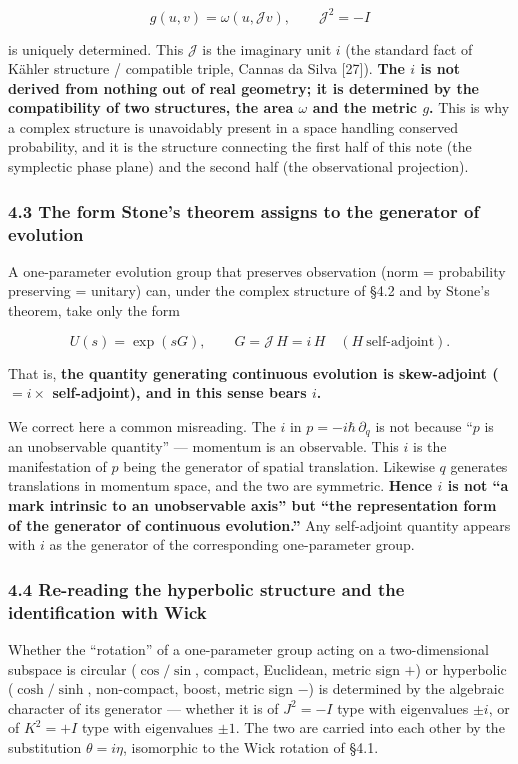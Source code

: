 \documentclass[
]{article}
\begin{document}
\[g(u,v)=\omega(u,\mathcal{J}v),\qquad \mathcal{J}^2=-I\]

is uniquely determined. This \(\mathcal{J}\) is the imaginary unit \(i\)
(the standard fact of Kähler structure / compatible triple, Cannas da
Silva {[}27{]}). \textbf{The \(i\) is not derived from nothing out of
real geometry; it is determined by the compatibility of two structures,
the area \(\omega\) and the metric \(g\).} This is why a complex
structure is unavoidably present in a space handling conserved
probability, and it is the structure connecting the first half of this
note (the symplectic phase plane) and the second half (the observational
projection).

\subsubsection{4.3 The form Stone's theorem assigns to the generator of
evolution}\label{the-form-stones-theorem-assigns-to-the-generator-of-evolution}

A one-parameter evolution group that preserves observation (norm =
probability preserving = unitary) can, under the complex structure of
§4.2 and by Stone's theorem, take only the form

\[U(s)=\exp(sG),\qquad G=\mathcal{J}\,H=i\,H\quad(H\ \text{self-adjoint}).\]

That is, \textbf{the quantity generating continuous evolution is
skew-adjoint (\(=i\times\) self-adjoint), and in this sense bears
\(i\).}

We correct here a common misreading. The \(i\) in
\(p=-i\hbar\,\partial_q\) is not because ``\(p\) is an unobservable
quantity'' --- momentum is an observable. This \(i\) is the
manifestation of \(p\) being the generator of spatial translation.
Likewise \(q\) generates translations in momentum space, and the two are
symmetric. \textbf{Hence \(i\) is not ``a mark intrinsic to an
unobservable axis'' but ``the representation form of the generator of
continuous evolution.''} Any self-adjoint quantity appears with \(i\) as
the generator of the corresponding one-parameter group.

\subsubsection{4.4 Re-reading the hyperbolic structure and the
identification with
Wick}\label{re-reading-the-hyperbolic-structure-and-the-identification-with-wick}

Whether the ``rotation'' of a one-parameter group acting on a
two-dimensional subspace is circular (\(\cos/\sin\), compact, Euclidean,
metric sign \(+\)) or hyperbolic (\(\cosh/\sinh\), non-compact, boost,
metric sign \(-\)) is determined by the algebraic character of its
generator --- whether it is of \(J^2=-I\) type with eigenvalues
\(\pm i\), or of \(K^2=+I\) type with eigenvalues \(\pm1\). The two are
carried into each other by the substitution \(\theta=i\eta\), isomorphic
to the Wick rotation of §4.1.
\end{document}
